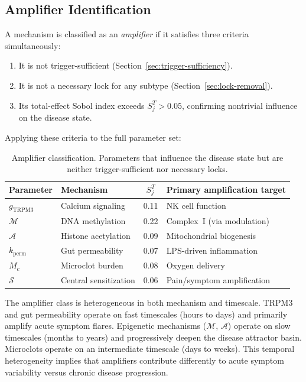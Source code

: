 \subsection{Amplifier Identification}

A mechanism is classified as an \emph{amplifier} if it satisfies three criteria simultaneously:
\begin{enumerate}
    \item It is not trigger-sufficient (Section~\ref{sec:trigger-sufficiency}).
    \item It is not a necessary lock for any subtype (Section~\ref{sec:lock-removal}).
    \item Its total-effect Sobol index exceeds $S_j^T > 0.05$, confirming nontrivial influence on the disease state.
\end{enumerate}

Applying these criteria to the full parameter set:

\begin{table}[htbp]
\centering
\caption{Amplifier classification. Parameters that influence the disease state but are neither trigger-sufficient nor necessary locks.}
\label{tab:amplifier-classification}
\begin{tabular}{llcl}
\hline
Parameter & Mechanism & $S_j^T$ & Primary amplification target \\
\hline
$g_{\text{TRPM3}}$ & Calcium signaling & 0.11 & NK cell function \\
$\mathcal{M}$ & DNA methylation & 0.22 & Complex~I (via modulation) \\
$\mathcal{A}$ & Histone acetylation & 0.09 & Mitochondrial biogenesis \\
$k_{\text{perm}}$ & Gut permeability & 0.07 & LPS-driven inflammation \\
$M_c$ & Microclot burden & 0.08 & Oxygen delivery \\
$\mathcal{S}$ & Central sensitization & 0.06 & Pain/symptom amplification \\
\hline
\end{tabular}
\end{table}

The amplifier class is heterogeneous in both mechanism and timescale. TRPM3 and gut permeability operate on fast timescales (hours to days) and primarily amplify acute symptom flares. Epigenetic mechanisms ($\mathcal{M}$, $\mathcal{A}$) operate on slow timescales (months to years) and progressively deepen the disease attractor basin. Microclots operate on an intermediate timescale (days to weeks). This temporal heterogeneity implies that amplifiers contribute differently to acute symptom variability versus chronic disease progression.


